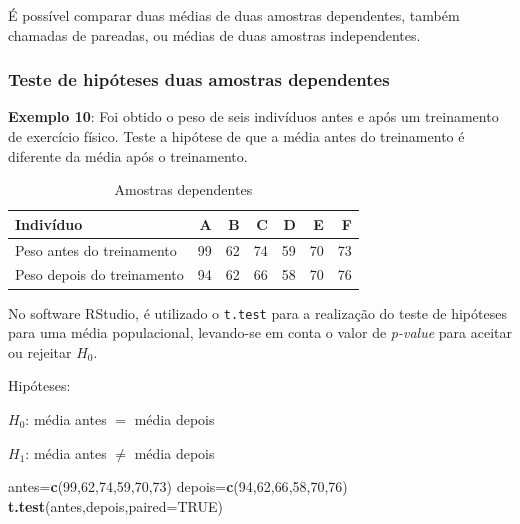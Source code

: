 \documentclass[12pt,brazil,oneside]{book}
\newenvironment{Shaded}{\begin{snugshade}}{\end{snugshade}}
\newcommand{\DataTypeTok}[1]{\textcolor[rgb]{0.13,0.29,0.53}{#1}}
\newcommand{\DecValTok}[1]{\textcolor[rgb]{0.00,0.00,0.81}{#1}}
\newcommand{\KeywordTok}[1]{\textcolor[rgb]{0.13,0.29,0.53}{\textbf{#1}}}
\newcommand{\NormalTok}[1]{#1}
\newcommand{\OtherTok}[1]{\textcolor[rgb]{0.56,0.35,0.01}{#1}}
\begin{document}
É possível comparar duas médias de duas amostras dependentes, também chamadas de pareadas, ou médias de duas amostras independentes.

\hypertarget{teste-de-hipoteses-duas-amostras-dependentes}{%
\subsubsection{Teste de hipóteses duas amostras dependentes}\label{teste-de-hipoteses-duas-amostras-dependentes}}

\textbf{Exemplo 10}: Foi obtido o peso de seis indivíduos antes e após um treinamento de exercício físico. Teste a hipótese de que a média antes do treinamento é diferente da média após o treinamento.

\begin{table}[t]

\caption{\label{tab:unnamed-chunk-143}Amostras dependentes}
\centering
\begin{tabular}{l|r|r|r|r|r|r}
\hline
Indivíduo & A & B & C & D & E & F\\
\hline
Peso antes do treinamento & 99 & 62 & 74 & 59 & 70 & 73\\
\hline
Peso depois do treinamento & 94 & 62 & 66 & 58 & 70 & 76\\
\hline
\end{tabular}
\end{table}

No software RStudio, é utilizado o \texttt{t.test} para a realização do teste de hipóteses para uma média populacional, levando-se em conta o valor de \emph{p-value} para aceitar ou rejeitar \(H_0\).

Hipóteses:

\textbf{\(H_0\)}: média antes \(=\) média depois

\textbf{\(H_1\)}: média antes \(\neq\) média depois

\begin{Shaded}
\begin{Highlighting}[]
\NormalTok{antes=}\KeywordTok{c}\NormalTok{(}\DecValTok{99}\NormalTok{,}\DecValTok{62}\NormalTok{,}\DecValTok{74}\NormalTok{,}\DecValTok{59}\NormalTok{,}\DecValTok{70}\NormalTok{,}\DecValTok{73}\NormalTok{)}
\NormalTok{depois=}\KeywordTok{c}\NormalTok{(}\DecValTok{94}\NormalTok{,}\DecValTok{62}\NormalTok{,}\DecValTok{66}\NormalTok{,}\DecValTok{58}\NormalTok{,}\DecValTok{70}\NormalTok{,}\DecValTok{76}\NormalTok{)}
\KeywordTok{t.test}\NormalTok{(antes,depois,}\DataTypeTok{paired=}\OtherTok{TRUE}\NormalTok{)}
\end{Highlighting}
\end{Shaded}
\end{document}
